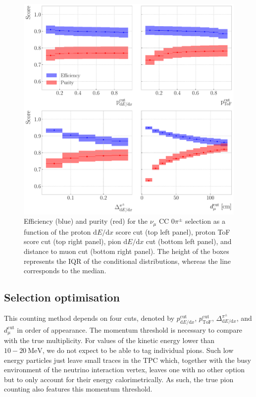 \begin{figure}[t]
    \centering
    \includegraphics[width=.85\linewidth]{Images/GAr_selection/pion_selection_0_pions_metrics.pdf}
    \caption[Efficiency and purity for the $\nu_{\mu}$ CC $0\pi^{\pm}$ selection as a function of the different cuts.]{Efficiency (blue) and purity (red) for the $\nu_{\mu}$ CC $0\pi^{\pm}$ selection as a function of the proton $\mathrm{d}E/\mathrm{d}x$ score cut (top left panel), proton ToF score cut (top right panel), pion $\mathrm{d}E/\mathrm{d}x$ cut (bottom left panel), and distance to muon cut (bottom right panel). The height of the boxes represents the IQR of the conditional distributions, whereas the line corresponds to the median.}
    \label{fig:pion_selection_0_pions_metrics}
\end{figure}

\subsection{Selection optimisation}

This counting method depends on four cuts, denoted by $p^{\mathrm{cut}}_{\mathrm{d}E/\mathrm{d}x}$, $p^{\mathrm{cut}}_{\mathrm{ToF}}$, $\Delta^{\pi^{\pm}}_{\mathrm{d}E/\mathrm{d}x}$, and $d^{\mathrm{cut}}_{\mu}$ in order of appearance. The momentum threshold is necessary to compare with the true multiplicity. For values of the kinetic energy lower than $10-20~\mathrm{MeV}$, we do not expect to be able to tag individual pions. Such low energy particles just leave small traces in the TPC which, together with the busy environment of the neutrino interaction vertex, leaves one with no other option but to only account for their energy calorimetrically. As such, the true pion counting also features this momentum threshold.

